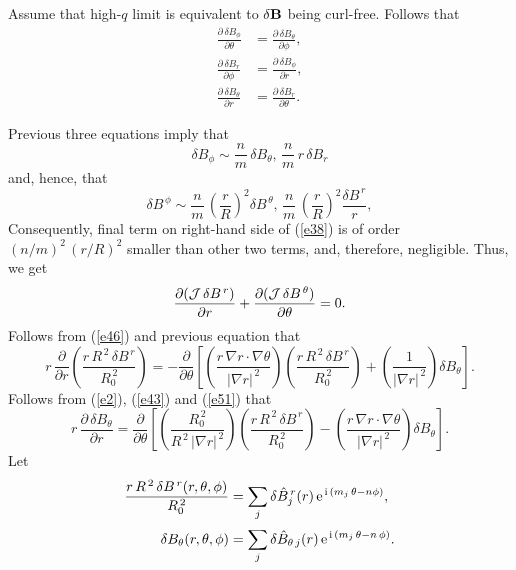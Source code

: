 \documentclass[notitlepage,12pt]{article}
\begin{document}
Assume that high-$q$ limit is equivalent to
 $\delta {\bf B}$ being curl-free.
Follows that
\begin{align}
\frac{\partial\,\delta B_\phi}{\partial\theta}&=\frac{\partial \,\delta B_\theta}{\partial\phi},\label{e52}\\[0.5ex]
 \frac{\partial\,\delta B_r}{\partial\phi}&=\frac{\partial \,\delta B_\phi}{\partial r},\\[0.5ex]
 \frac{\partial\,\delta B_\theta}{\partial r}&= \frac{\partial \,\delta B_r}{\partial \theta}.\label{e51}
\end{align}

Previous three equations imply that
\begin{equation}
\delta B_\phi \sim \frac{n}{m}\,\delta B_\theta,\, \frac{n}{m}\,r\,\delta B_r
\end{equation}
and, hence, that 
\begin{equation}
\delta B^{\,\phi} \sim \frac{n}{m}\,\left(\frac{r}{R}\right)^2 \delta B^{\,\theta},\, \frac{n}{m}\,\left(\frac{r}{R}\right)^2 \frac{\delta B^{\,r}}{r}, 
\end{equation}
Consequently,  final term on right-hand side of (\ref{e38}) is of order $(n/m)^2\,(r/R)^2$ smaller than other two terms, and, therefore, negligible. 
Thus, we get 
\begin{equation}
\frac{\partial ({\cal J}\,\delta B^{\,r})}{\partial r}+ \frac{\partial({\cal J}\,\delta B^{\,\theta})}{\partial\theta}  =0.
\end{equation}
Follows from (\ref{e46}) and previous equation that
\begin{equation}
r\,\frac{\partial}{\partial r}\left(\frac{r\,R^{\,2}\,\delta B^{\,r}}{R_0^{\,2}}\right)
=-\frac{\partial}{\partial\theta}\!\left[\left(\frac{r\,\nabla r\cdot\nabla \theta}{|\nabla r|^{\,2}}\right)\left(\frac{r\,R^{\,2}\,\delta B^{\,r}}{R_0^{\,2}}\right) +\left(\frac{1}{|\nabla r|^{\,2}}\right)\delta B_\theta\right].
\end{equation}
Follows from (\ref{e2}), (\ref{e43}) and (\ref{e51}) that
\begin{equation}
r\,\frac{\partial\,\delta B_\theta}{\partial r} =\frac{\partial}{\partial\theta}\!\left[\left(\frac{R_0^{\,2}}{R^{\,2}\,|\nabla r|^{\,2}}\right)\left(\frac{r\,R^{\,2}\,\delta B^{\,r}}{R_0^{\,2}}\right)
-\left(\frac{r\,\nabla r\cdot\nabla\theta}{|\nabla r|^{\,2}}\right)\delta B_\theta\right].
\end{equation}
Let
\begin{align}
\frac{r\,R^{\,2}\,\delta B^{\,r}(r,\theta,\phi)}{R_0^{\,2}}&= \sum_j \delta\hat{B}_j^{\,r}(r)\,{\rm e}^{\,{\rm i}\,(m_j\,\theta-n\phi)},\\[0.5ex]
\delta B_\theta (r,\theta,\phi)&=\sum_j \delta\hat{B}_{\theta\,j}(r)\,{\rm e}^{\,{\rm i}\,(m_j\,\theta-n\,\phi)}.
\end{align}
\end{document}

